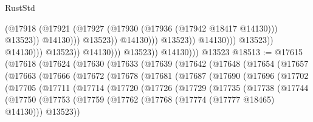 \begin{lexlean}{RustStd}
\begin{coremodule}
                                                          (@17918
                                                            (@17921
                                                              (@17927
                                                                (@17930
                                                                  (@17936 (@17942 @18417 @14130)))
                                                                @13523))
                                                            @14130)))
                                                      @13523))
                                                  @14130)))
                                            @13523))
                                        @14130)))
                                  @13523))
                              @14130)))
                        @13523))
                    @14130)))
              @13523))
          @14130)))
    @13523
@18513 := @17615
    (@17618
      (@17624
        (@17630
          (@17633
            (@17639
              (@17642
                (@17648
                  (@17654
                    (@17657
                      (@17663
                        (@17666
                          (@17672
                            (@17678
                              (@17681
                                (@17687
                                  (@17690
                                    (@17696
                                      (@17702
                                        (@17705
                                          (@17711
                                            (@17714
                                              (@17720
                                                (@17726
                                                  (@17729
                                                    (@17735
                                                      (@17738
                                                        (@17744
                                                          (@17750
                                                            (@17753
                                                              (@17759
                                                                (@17762
                                                                  (@17768
                                                                    (@17774
                                                                      (@17777 @18465)
                                                                      @14130)))
                                                                @13523))

\end{coremodule}
\end{lexlean}
